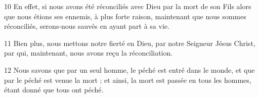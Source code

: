 
10 En effet, si nous avons été réconciliés avec Dieu par la mort de son Fils alors que nous étions ses ennemis, à plus forte raison, maintenant que nous sommes réconciliés, serons-nous sauvés en ayant part à sa vie.

11 Bien plus, nous mettons notre fierté en Dieu, par notre Seigneur Jésus Christ, par qui, maintenant, nous avons reçu la réconciliation.

12 Nous savons que par un seul homme, le péché est entré dans le monde, et que par le péché est venue la mort ; et ainsi, la mort est passée en tous les hommes, étant donné que tous ont péché.
